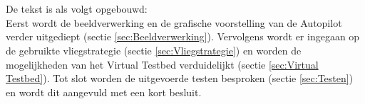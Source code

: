 \\
\\
De tekst is als volgt opgebouwd:\\
Eerst wordt de beeldverwerking en de grafische voorstelling van de Autopilot verder uitgediept (sectie \ref{sec:Beeldverwerking}). Vervolgens wordt er ingegaan op de gebruikte vliegstrategie (sectie \ref{sec:Vliegstrategie}) en worden de mogelijkheden van het Virtual Testbed verduidelijkt (sectie \ref{sec:Virtual Testbed}). Tot slot worden de uitgevoerde testen besproken (sectie \ref{sec:Testen}) en wordt dit aangevuld met een kort besluit. 
